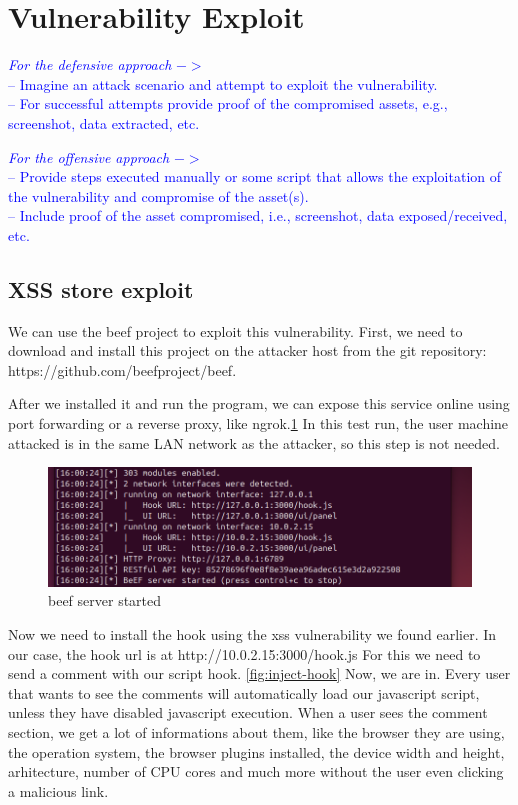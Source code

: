 \documentclass{article}
\begin{document}
\section{Vulnerability Exploit}
\label{}

\textcolor{blue}{\textit{For the defensive approach} $->$\\
    -- Imagine an attack scenario and attempt to exploit the vulnerability.\\
    -- For successful attempts provide proof of the compromised assets, e.g., screenshot, data extracted, etc.}

\textcolor{blue}{\textit{For the offensive approach} $->$\\
    -- Provide steps executed manually or some script that allows the exploitation of the vulnerability and compromise of the asset(s).\\
    -- Include proof of the asset compromised, i.e., screenshot, data exposed/received, etc. }


\subsection{XSS store exploit}
\label{section:xss-store-exploit}
We can use the beef project to exploit this vulnerability. First, we need to download and install this project on the attacker host from the git repository: https://github.com/beefproject/beef.

After we installed it and run the program, we can expose this service online using port forwarding or a reverse proxy, like ngrok.\ref{fig:beef-server-started}
In this test run, the user machine attacked is in the same LAN network as the attacker, so this step is not needed.

\begin{figure}[H]
    \centering
    \includegraphics[width=1\linewidth]{Figures/beef/beef-server-started.png}
    \caption{\label{fig:beef-server-started}beef server started}
\end{figure}


Now we need to install the hook using the xss vulnerability we found earlier. In our case, the hook url is at http://10.0.2.15:3000/hook.js
For this we need to send a comment with our script hook. \ref{fig:inject-hook}
Now, we are in. Every user that wants to see the comments will automatically load our javascript script, unless they have disabled javascript execution.
When a user sees the comment section, we get a lot of informations about them, like the browser they are using, the operation system, the browser plugins installed, the device width and height, arhitecture, number of CPU cores and much more without the user even clicking a malicious link.
\end{document}
